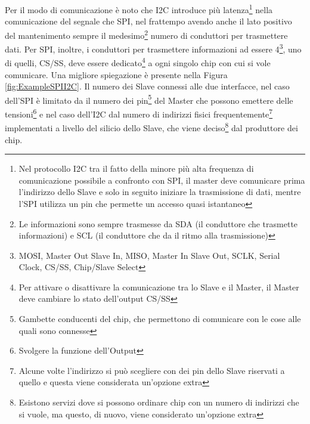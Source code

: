 \documentclass[a4paper, 10pt, final]{article} %
\begin{document}
    Per il modo di comunicazione \`{e} noto che I2C introduce pi\`{u} latenza\footnote{Nel protocollo I2C tra il fatto della minore pi\`{u} alta frequenza di comunicazione possibile a confronto con SPI, il master deve comunicare prima l'indirizzo dello Slave e solo in seguito iniziare la trasmissione di dati, mentre l'SPI utilizza un pin che permette un accesso quasi istantaneo} nella comunicazione del segnale che SPI, nel frattempo avendo anche il lato positivo del mantenimento sempre il medesimo\footnote{Le informazioni sono sempre trasmesse da SDA (il conduttore che trasmette informazioni) e SCL (il conduttore che da il ritmo alla trasmissione)} numero di conduttori per trasmettere dati.
    Per SPI, inoltre, i conduttori per trasmettere informazioni ad essere 4\footnote{MOSI, Master Out Slave In, MISO, Master In Slave Out, SCLK, Serial Clock, CS/SS, Chip/Slave Select}, uno di quelli, CS/SS, deve essere dedicato\footnote{Per attivare o disattivare la comunicazione tra lo Slave e il Master, il Master deve cambiare lo stato dell'output CS/SS} a ogni singolo chip con cui si vole comunicare.
    Una migliore spiegazione \`{e} presente nella Figura \ref{fig:ExampleSPII2C}.
    Il numero dei Slave connessi alle due interfacce, nel caso dell'SPI \`{e} limitato da il numero dei pin\footnote{Gambette conducenti del chip, che permettono di comunicare con le cose alle quali sono connesse} del Master che possono emettere delle tensioni\footnote{Svolgere la funzione dell'Output} e nel caso dell'I2C dal numero di indirizzi fisici frequentemente\footnote{Alcune volte l'indirizzo si pu\`{o} scegliere con dei pin dello Slave riservati a quello e questa viene considerata un'opzione extra} implementati a livello del silicio dello Slave, che viene deciso\footnote{Esistono servizi dove si possono ordinare chip con un numero di indirizzi che si vuole, ma questo, di nuovo, viene considerato un'opzione extra} dal produttore dei chip.
\end{document}
